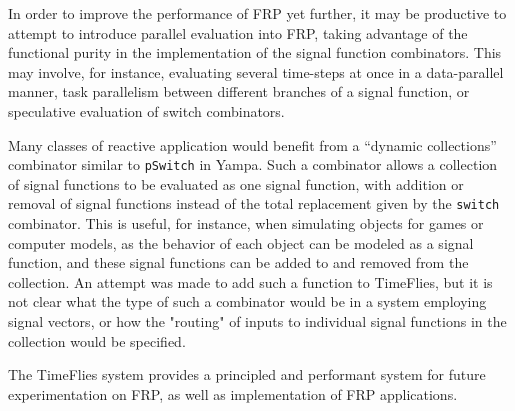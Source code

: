 In order to improve the performance of FRP yet further, it may be productive to attempt
to introduce parallel evaluation into FRP, taking advantage of the functional purity in
the implementation of the signal function combinators. This may involve, for instance,
evaluating several time-steps at once in a data-parallel manner, task parallelism
between different branches of a signal function, or speculative evaluation of switch
combinators.

Many classes of reactive application would benefit from a ``dynamic collections'' combinator
similar to {\tt pSwitch} in Yampa. Such a combinator allows a collection of signal functions
to be evaluated as one signal function, with addition or removal of signal functions instead
of the total replacement given by the {\tt switch} combinator. This is useful, for instance,
when simulating objects for games or computer models, as the behavior of each object can be
modeled as a signal function, and these signal functions can be added to and removed from the
collection. An attempt was made to add such a function to TimeFlies, but it is not clear what 
the type of such a combinator would be in a system employing signal vectors, or how the
"routing" of inputs to individual signal functions in the collection would be specified.

The TimeFlies system provides a principled and performant system for future experimentation
on FRP, as well as implementation of FRP applications.
